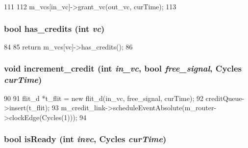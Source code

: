\begin{DoxyCode}
111     {
112         m_vcs[in_vc]->grant_vc(out_vc, curTime);
113     }
\end{DoxyCode}
\hypertarget{classInputUnit__d_ae60433780eab2faa984318e2507b9a4a}{
\subsubsection[{has\_\-credits}]{\setlength{\rightskip}{0pt plus 5cm}bool has\_\-credits (int {\em vc})}}
\label{classInputUnit__d_ae60433780eab2faa984318e2507b9a4a}



\begin{DoxyCode}
84     {
85         return m_vcs[vc]->has_credits();
86     }
\end{DoxyCode}
\hypertarget{classInputUnit__d_aa389f8069c58070a89061dc51d8871f2}{
\subsubsection[{increment\_\-credit}]{\setlength{\rightskip}{0pt plus 5cm}void increment\_\-credit (int {\em in\_\-vc}, \/  bool {\em free\_\-signal}, \/  {\bf Cycles} {\em curTime})}}
\label{classInputUnit__d_aa389f8069c58070a89061dc51d8871f2}



\begin{DoxyCode}
90     {
91         flit_d *t_flit = new flit_d(in_vc, free_signal, curTime);
92         creditQueue->insert(t_flit);
93         m_credit_link->scheduleEventAbsolute(m_router->clockEdge(Cycles(1)));
94     }
\end{DoxyCode}
\hypertarget{classInputUnit__d_a6651ea70e8d93b6a54fcded1aa9355eb}{
\subsubsection[{isReady}]{\setlength{\rightskip}{0pt plus 5cm}bool isReady (int {\em invc}, \/  {\bf Cycles} {\em curTime})}}
\label{classInputUnit__d_a6651ea70e8d93b6a54fcded1aa9355eb}



